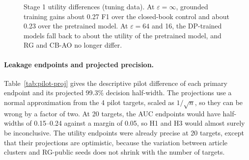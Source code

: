 \documentclass[11pt]{article}
\begin{document}
\begin{figure}[tbp]
\centering
{}
\caption{Stage 1 utility differences (tuning data). At $\varepsilon=\infty$, grounded training gains about 0.27 F1 over the closed-book control and about 0.23 over the pretrained model. At $\varepsilon=64$ and 16, the DP-trained models fall back to about the utility of the pretrained model, and RG and CB-AO no longer differ.}\label{fig:pilot-utility}
\end{figure}

\paragraph{Leakage endpoints and projected precision.} Table~\ref{tab:pilot-proj} gives the descriptive pilot difference of each primary endpoint and its projected 99.3\% decision half-width. The projections use a normal approximation from the 4 pilot targets, scaled as $1/\sqrt{n}$, so they can be wrong by a factor of two. At 20 targets, the AUC endpoints would have half-widths of 0.15--0.24 against a margin of 0.05, so H1 and H3 would almost surely be inconclusive. The utility endpoints were already precise at 20 targets, except that their projections are optimistic, because the variation between article clusters and RG-public seeds does not shrink with the number of targets.
\end{document}
